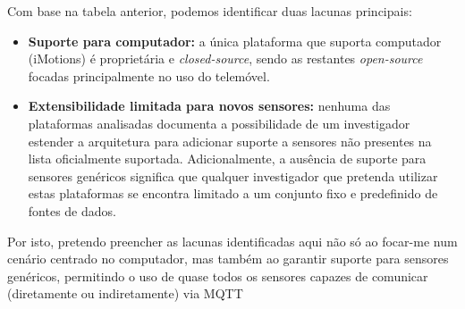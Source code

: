 Com base na tabela anterior, podemos identificar duas lacunas principais:
\begin{itemize}
    \item \textbf{Suporte para computador:} a única plataforma que suporta computador (iMotions) é proprietária e \textit{closed-source}, sendo as restantes \textit{open-source} focadas principalmente no uso do telemóvel.
    \item \textbf{Extensibilidade limitada para novos sensores:} nenhuma das plataformas analisadas documenta a possibilidade de um investigador estender a arquitetura para adicionar suporte a sensores não presentes na lista oficialmente suportada. Adicionalmente, a ausência de suporte para sensores genéricos significa que qualquer investigador que pretenda utilizar estas plataformas se encontra limitado a um conjunto fixo e predefinido de fontes de dados.
\end{itemize}

Por isto, pretendo preencher as lacunas identificadas aqui não só ao focar-me num cenário centrado no computador, mas também ao garantir suporte para sensores genéricos, permitindo o uso de quase todos os sensores capazes de comunicar (diretamente ou indiretamente) via \ac{MQTT}

